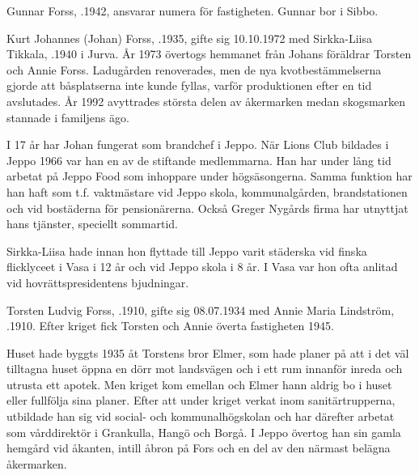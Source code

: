 
Gunnar Forss, .1942, ansvarar numera för fastigheten. Gunnar bor i Sibbo.


Kurt Johannes (Johan) Forss, .1935, gifte sig 10.10.1972 med Sirkka-Liisa Tikkala, .1940 i Jurva. År 1973 övertogs hemmanet från Johans föräldrar Torsten och Annie Forss. Ladugården renoverades, men de nya kvotbestämmelserna gjorde att båsplatserna inte kunde fyllas, varför produktionen efter en tid avslutades. År 1992 avyttrades största delen av åkermarken medan skogsmarken stannade i familjens ägo.


I 17 år har Johan fungerat som brandchef i Jeppo. När Lions Club bildades i Jeppo 1966 var han en av de stiftande medlemmarna. Han har under lång tid arbetat på Jeppo Food som inhoppare under högsäsongerna. Samma funktion har han haft som t.f. vaktmästare vid Jeppo skola, kommunalgården, brandstationen och vid bostäderna för pensionärerna. Också Greger Nygårds firma har utnyttjat hans tjänster, speciellt sommartid.

Sirkka-Liisa hade innan hon flyttade till Jeppo varit städerska vid finska flicklyceet i Vasa i 12 år och vid Jeppo skola i 8 år. I Vasa var hon ofta anlitad vid hovrättspresidentens bjudningar.
\begin{jhchildren}
  \item {}
  \item {}
\end{jhchildren}


Torsten Ludvig Forss, .1910, gifte sig 08.07.1934 med Annie Maria Lindström, .1910. Efter kriget fick Torsten och Annie överta fastigheten 1945.

Huset hade byggts 1935 åt Torstens bror Elmer, som hade planer på att i det väl tilltagna huset öppna en dörr mot landsvägen och i ett rum innanför inreda och utrusta ett apotek. Men kriget kom emellan och Elmer hann aldrig bo i huset eller fullfölja sina planer. Efter att under kriget verkat inom sanitärtrupperna, utbildade han sig vid social- och kommunalhögskolan och har därefter arbetat som vårddirektör i Grankulla, Hangö och Borgå. I Jeppo övertog han sin gamla hemgård vid åkanten, intill åbron på Fors och en del av den närmast belägna åkermarken.

